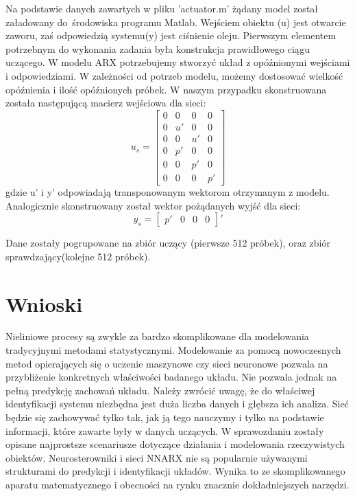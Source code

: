 \documentclass{article}
\begin{document}
Na podstawie danych zawartych w pliku 'actuator.m' żądany model został załadowany
do środowiska programu Matlab. Wejściem obiektu (u) jest
otwarcie zaworu, zaś odpowiedzią systemu(y) jest ciśnienie oleju.
Pierwszym elementem potrzebnym do wykonania zadania była konstrukcja prawidłowego ciągu uczącego.
W modelu ARX potrzebujemy stworzyć układ z opóźnionymi wejściami i odpowiedziami.
W zależności od potrzeb modelu, możemy dostosować wielkość opóźnienia i ilość opóźnionych próbek.
W naszym przypadku skonstruowana została następującą macierz wejściowa dla sieci:
\begin{equation}
	u_s= \begin{bmatrix} 0 & 0 & 0 & 0 \\ 0 & u' & 0 & 0 \\ 0 & 0 & u' & 0 \\ 0 & p' & 0 & 0 \\ 0 & 0 & p' &  0 \\ 0 & 0 & 0 & p' \end{bmatrix}
\end{equation}
gdzie u' i y' odpowiadają transponowanym wektorom otrzymanym z modelu.
Analogicznie skonstruowany został wektor pożądanych wyjść dla sieci:
\begin{equation}
	y_s= \begin{bmatrix} p' & 0 & 0 & 0  \end{bmatrix}'
\end{equation}


Dane zostały pogrupowane na zbiór uczący (pierwsze 512 próbek), oraz
zbiór sprawdzający(kolejne 512 próbek).

\section{Wnioski}
Nieliniowe procesy są zwykle za bardzo skomplikowane dla modelowania tradycyjnymi
metodami statystycznymi. Modelowanie za pomocą nowoczesnych metod opierających
się o uczenie maszynowe czy sieci neuronowe pozwala na przybliżenie konkretnych
właściwości badanego układu. Nie pozwala jednak na pełną predykcję zachowań układu.
Należy zwrócić uwagę, że do właściwej identyfikacji systemu niezbędna jest duża
liczba danych i głębsza ich analiza. Sieć będzie się zachowywać tylko tak, jak
ją tego nauczymy i tylko na podstawie informacji, które zawarte były w danych
uczących.
W sprawozdaniu zostały opisane najprostsze scenariusze dotyczące działania
i modelowania rzeczywistych obiektów.
Neurosterowniki i sieci NNARX nie są popularnie używanymi strukturami do
predykcji i identyfikacji układów. Wynika to ze skomplikowanego aparatu matematycznego
i obecności na rynku znacznie dokładniejszych narzędzi.
\end{document}
